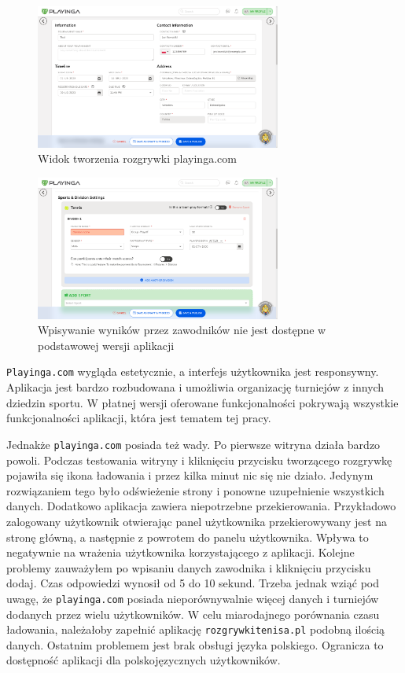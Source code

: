 \documentclass[shortabstract]{iithesis}
\begin{document}
\begin{figure}[H]
    \centering
    \includegraphics[width=0.72\textwidth,valign=t]{assets/alt_rozw/playinga_tworzenie.png}
    \caption{Widok tworzenia rozgrywki playinga.com}
\end{figure}
\begin{figure}[H]
    \centering
    \includegraphics[width=0.72\textwidth,valign=t]{assets/alt_rozw/playinga_tworzenie2.png}
    \caption{Wpisywanie wyników przez zawodników nie jest dostępne w podstawowej wersji aplikacji}
\end{figure}
\texttt{Playinga.com} wygląda estetycznie, a interfejs użytkownika jest responsywny. Aplikacja jest bardzo rozbudowana i umożliwia organizację turniejów z innych dziedzin sportu.
W płatnej wersji oferowane funkcjonalności pokrywają wszystkie funkcjonalności aplikacji, która jest tematem tej pracy.
\par
Jednakże \texttt{playinga.com} posiada też wady.
Po pierwsze witryna działa bardzo powoli.
Podczas testowania witryny i kliknięciu przycisku tworzącego rozgrywkę pojawiła się ikona ładowania i przez kilka minut nic się nie działo.
Jedynym rozwiązaniem tego było odświeżenie strony i ponowne uzupełnienie wszystkich danych.
Dodatkowo aplikacja zawiera niepotrzebne przekierowania.
Przykładowo zalogowany użytkownik otwierając panel użytkownika przekierowywany jest na stronę główną, a następnie z powrotem do panelu użytkownika.
Wpływa to negatywnie na wrażenia użytkownika korzystającego z aplikacji.
Kolejne problemy zauważyłem po wpisaniu danych zawodnika i kliknięciu przycisku dodaj.
Czas odpowiedzi wynosił od 5 do 10 sekund. Trzeba jednak wziąć pod uwagę, że \texttt{playinga.com} posiada nieporównywalnie więcej danych i turniejów dodanych przez wielu użytkowników.
W celu miarodajnego porównania czasu ładowania, należałoby zapełnić aplikację \texttt{rozgrywkitenisa.pl} podobną ilością danych.
Ostatnim problemem jest brak obsługi języka polskiego. Ogranicza to dostępność aplikacji dla polskojęzycznych użytkowników.
\end{document}
